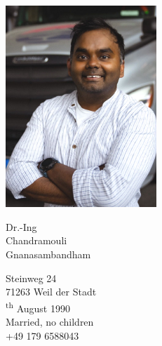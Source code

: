 \documentclass{mycv}
\begin{document}
\sloppy %
\color{templateColor1}

\normalfont
\begin{minipage}[c]{0.32\textwidth}
  \includegraphics[width=5.7cm]{../img/CV_Photo_Informal_Comp.png}
\end{minipage}
\begin{minipage}[]{0.8\textwidth}

  \vspace{5mm}
      {\huge Dr.-Ing }\\

      {\Huge Chandramouli}\\

    {\Huge Gnanasambandham}
    \vspace{2mm}

    \vspace{2mm}

    Steinweg 24\\
    71263 Weil der Stadt\\

    \textsuperscript{th} August 1990\\
  \maritalStatusIcon Married, no children\\
  \telephoneIcon +49 179 6588043\\
  \mailIcon \href{mailto:chandramouli@torc.ai}{}
  
  \vspace{13mm}
\end{minipage}
\end{document}
